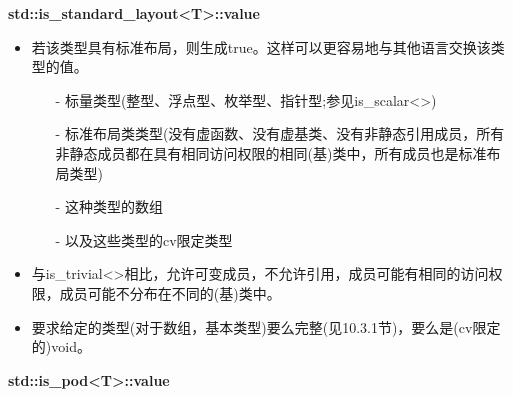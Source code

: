 \textbf{std::is\_standard\_layout<T>::value}

\begin{itemize}
\item 
若该类型具有标准布局，则生成true。这样可以更容易地与其他语言交换该类型的值。

\begin{itemize}
\item [-]
标量类型(整型、浮点型、枚举型、指针型;参见is\_scalar<>)

\item [-]
标准布局类类型(没有虚函数、没有虚基类、没有非静态引用成员，所有非静态成员都在具有相同访问权限的相同(基)类中，所有成员也是标准布局类型)

\item [-]
这种类型的数组

\item [-]
以及这些类型的cv限定类型
\end{itemize}

\item 
与is\_trivial<>相比，允许可变成员，不允许引用，成员可能有相同的访问权限，成员可能不分布在不同的(基)类中。

\item 
要求给定的类型(对于数组，基本类型)要么完整(见10.3.1节)，要么是(cv限定的)void。
\end{itemize}

\textbf{std::is\_pod<T>::value}

